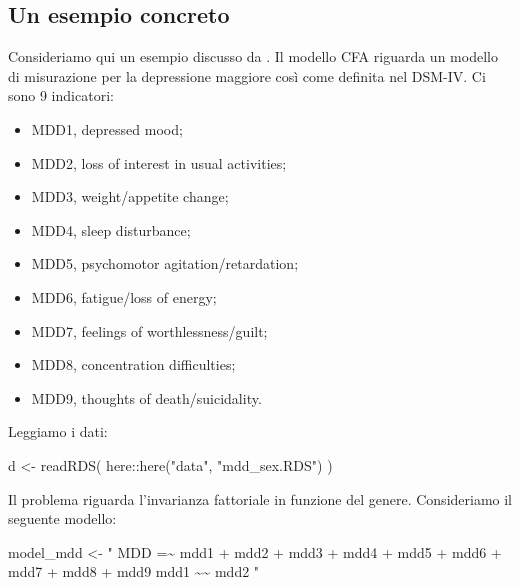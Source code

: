 \documentclass[
  11pt,
]{krantz}
\makeatletter
\newenvironment{Shaded}{\begin{snugshade}}{\end{snugshade}}
\newcommand{\FunctionTok}[1]{\textcolor[rgb]{0,0,0}{#1}}
\newcommand{\NormalTok}[1]{#1}
\newcommand{\OtherTok}[1]{\textcolor[rgb]{0.37,0.37,0.37}{#1}}
\newcommand{\SpecialCharTok}[1]{\textcolor[rgb]{0,0,0}{#1}}
\newcommand{\StringTok}[1]{\textcolor[rgb]{0.5,0.5,0.5}{#1}}
\providecommand{\tightlist}{%
  \setlength{\itemsep}{0pt}\setlength{\parskip}{0pt}}
\newenvironment{kframe}{%
\medskip{}
\setlength{\fboxsep}{.8em}
 \def\at@end@of@kframe{}%
 \ifinner\ifhmode%
  \def\at@end@of@kframe{\end{minipage}}%
  \begin{minipage}{\columnwidth}%
 \fi\fi%
 \def\FrameCommand##1{\hskip\@totalleftmargin \hskip-\fboxsep
 \colorbox{shadecolor}{##1}\hskip-\fboxsep
     \hskip-\linewidth \hskip-\@totalleftmargin \hskip\columnwidth}%
 \MakeFramed {\advance\hsize-\width
   \@totalleftmargin\z@ \linewidth\hsize
   \@setminipage}}%
 {\par\unskip\endMakeFramed%
 \at@end@of@kframe}
\renewenvironment{Shaded}{\begin{kframe}}{\end{kframe}}
\theoremstyle{definition}
\theoremstyle{definition}
\theoremstyle{definition}
\theoremstyle{definition}
\theoremstyle{remark}
\makeatother
\begin{document}
\hypertarget{un-esempio-concreto-3}{%
\subsection{Un esempio concreto}\label{un-esempio-concreto-3}}

Consideriamo qui un esempio discusso da \citet{brown2015confirmatory}. Il modello CFA riguarda un modello di misurazione per la depressione maggiore così come definita nel DSM-IV. Ci sono 9 indicatori:

\begin{itemize}
\tightlist
\item
  MDD1, depressed mood;
\item
  MDD2, loss of interest in usual activities;
\item
  MDD3, weight/appetite change;
\item
  MDD4, sleep disturbance;
\item
  MDD5, psychomotor agitation/retardation;
\item
  MDD6, fatigue/loss of energy;
\item
  MDD7, feelings of worthlessness/guilt;
\item
  MDD8, concentration difficulties;
\item
  MDD9, thoughts of death/suicidality.
\end{itemize}

Leggiamo i dati:

\begin{Shaded}
\begin{Highlighting}[]
\NormalTok{d }\OtherTok{\textless{}{-}} \FunctionTok{readRDS}\NormalTok{(}
\NormalTok{  here}\SpecialCharTok{::}\FunctionTok{here}\NormalTok{(}\StringTok{"data"}\NormalTok{, }\StringTok{"mdd\_sex.RDS"}\NormalTok{)}
\NormalTok{)}
\end{Highlighting}
\end{Shaded}

Il problema riguarda l'invarianza fattoriale in funzione del genere. Consideriamo il seguente modello:

\begin{Shaded}
\begin{Highlighting}[]
\NormalTok{model\_mdd }\OtherTok{\textless{}{-}} \StringTok{"}
\StringTok{  MDD =\textasciitilde{} mdd1 + mdd2 + mdd3 + mdd4 + mdd5 + mdd6 + mdd7 + mdd8 +}
\StringTok{         mdd9}
\StringTok{  mdd1 \textasciitilde{}\textasciitilde{} mdd2}
\StringTok{"}
\end{Highlighting}
\end{Shaded}
\end{document}
